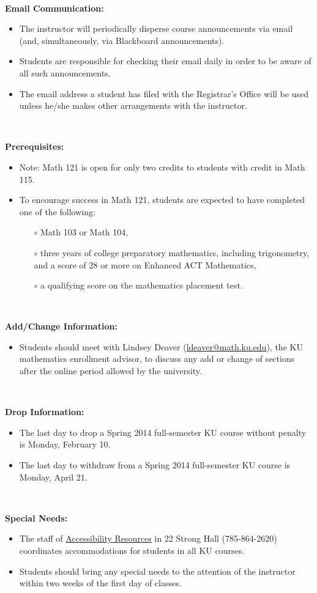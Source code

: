 \documentclass[10pt]{amsart}
\begin{document}
\,\,

{\bf Email Communication:}
\begin{itemize}
	\item The instructor will periodically disperse course announcements via email (and, simultaneously, via Blackboard announcements).
	\item Students are responsible for checking their email daily in order to be aware of all such announcements.
	\item The email address a student has filed with the Registrar's Office will be used unless he/she makes other arrangements with the instructor.
\end{itemize}

\,\,

{\bf Prerequisites:}
\begin{itemize}
    \item Note: Math 121 is open for only two credits to students with credit in Math 115.
    \item To encourage success in Math 121, students are expected to have completed one of the following:
    \begin{itemize}
    	\item[$\circ$] Math 103 or Math 104,
    	\item[$\circ$] three years of college preparatory mathematics, including trigonometry, and a score of 28 or more on Enhanced ACT Mathematics,
    	\item[$\circ$] a qualifying score on the mathematics placement test.
    \end{itemize}
\end{itemize}

\,\,

{\bf Add/Change Information:}
\begin{itemize}
	\item Students should meet with Lindsey Deaver (\href{mailto:ldeaver@math.ku.edu}{ldeaver@math.ku.edu}), the KU mathematics enrollment advisor, to discuss any add or change of sections after the online period allowed by the university.
\end{itemize}

\,\,

{\bf Drop Information:}
\begin{itemize}
	\item The last day to drop a Spring 2014 full-semester KU course without penalty is Monday, February 10.
	\item The last day to withdraw from a Spring 2014 full-semester KU course is Monday, April 21.
\end{itemize}

\,\,


{\bf Special Needs:}
\begin{itemize}
	\item The staff of \href{http://disability.ku.edu/}{Accessibility Resources} in 22 Strong Hall (785-864-2620) coordinates accommodations for students in all KU courses. 
	\item Students should bring any special needs to the attention of the instructor within two weeks of the first day of classes.
\end{itemize}

\,\,
\end{document}
